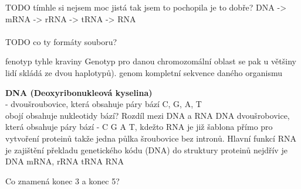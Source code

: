 \documentclass[czech,DP]{thesiskiv}
\numberwithin{equation}{section}
\begin{document}
TODO tímhle si nejsem moc jistá tak jsem to pochopila je to dobře? DNA -> mRNA -> rRNA -> tRNA -> RNA
\\
\\
TODO co ty formáty souboru?

fenotyp tyhle kraviny
Genotyp pro danou chromozomální oblast se pak u většiny lidí skládá ze dvou haplotypů).
genom kompletní sekvence daného organismu

\textbf{DNA (Deoxyribonukleová kyselina)} \\ 
 - dvoušroubovice, která obsahuje páry bází C, G, A, T \\


obojí obsahuje nukleotidy bází? 
Rozdíl mezi DNA a RNA
DNA dvoušrobovice, která obsahuje páry bází - C G A T, kdežto RNA je již šablona přímo pro vytvoření proteinů takže jedna půlka šroubovice bez intronů. 
Hlavní funkcí RNA je zajištění překladu genetického kódu (DNA) do struktury proteinů
nejdřív je DNA  mRNA, rRNA tRNA RNA

Co znamená konec 3 a konec 5? 

% 
%
\nocite{*}

{\raggedright\small

}


\appendix
\end{document}
